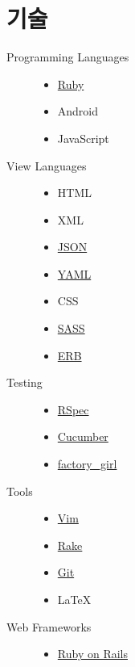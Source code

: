 \documentclass[a4paper,10pt]{article}
\begin{document}
\section{기술}
\begin{description}
  \item[Programming Languages] \hfill
    \begin{itemize}
      \item \href{https://www.ruby-lang.org/}{Ruby}
      \item Android
      \item JavaScript
    \end{itemize}
  \item[View Languages] \hfill
    \begin{itemize}
      \item HTML
      \item XML
      \item \href{http://json.org}{JSON}
      \item \href{http://www.yaml.org}{YAML}
      \item CSS
      \item \href{http://sass-lang.com}{SASS}
      \item \href{http://ruby-doc.org/stdlib/libdoc/erb/rdoc/ERB.html}{ERB}
    \end{itemize}
  \item[Testing] \hfill
    \begin{itemize}
      \item \href{http://rspec.info}{RSpec}
      \item \href{http://cukes.info}{Cucumber}
      \item \href{https://github.com/thoughtbot/factory_girl}{factory\_girl}
    \end{itemize}
  \item[Tools] \hfill
    \begin{itemize}
      \item \href{http://www.vim.org}{Vim}
      \item \href{https://github.com/ruby/rake}{Rake}
      \item \href{http://git-scm.com}{Git}
      \item {\fb \LaTeX}\setmainfont[SmallCapsFont=Fontin-SmallCaps.otf]{Fontin.otf}
    \end{itemize}
  \item[Web Frameworks] \hfill
    \begin{itemize}
      \item \href{http://rubyonrails.org}{Ruby on Rails}

\end{itemize}
\end{description}
\end{document}
